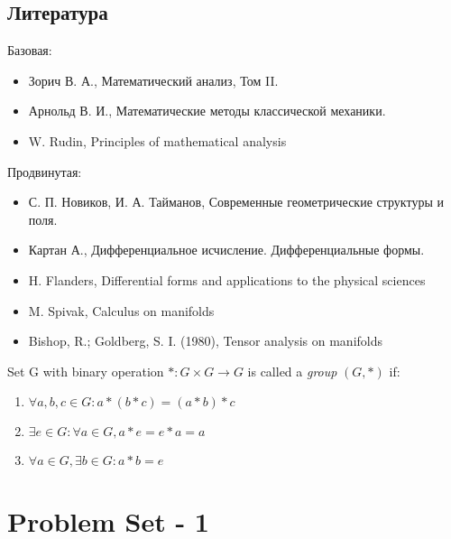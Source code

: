 \documentclass{article}
\begin{document}
 	
 	\subsection*{Литература}
 	Базовая:
 	\begin{itemize}
 		\item Зорич В. А., Математический анализ, Том II.
 		\item Арнольд В. И., Математические методы классической механики. 
 		\item  W. Rudin, Principles of mathematical analysis
 	\end{itemize}
 	Продвинутая:
 	\begin{itemize}
 		\item С. П. Новиков, И. А. Тайманов, Современные геометрические структуры и поля.
 		\item Картан А., Дифференциальное исчисление. Дифференциальные формы.
 		\item H. Flanders, Differential forms and applications to the physical sciences
 		\item M. Spivak, Calculus on manifolds
 		\item Bishop, R.; Goldberg, S. I. (1980), Tensor analysis on manifolds
 	\end{itemize}
 	\newpage
 	Set G with binary operation $*: G \times G \to G$ is called a \textit{group} $(G, *)$ if:
 	\begin{enumerate}
 		\item $\forall a,b,c \in G: a*(b*c) = (a*b)*c $
 		\item $\exists e \in G: \forall a \in G, a*e=e*a=a$
 		\item $\forall a \in G, \exists b\in G: a*b = e$
 	\end{enumerate}
 	{\centering
 		\section*{Problem 	Set - 1}}
\end{document}
